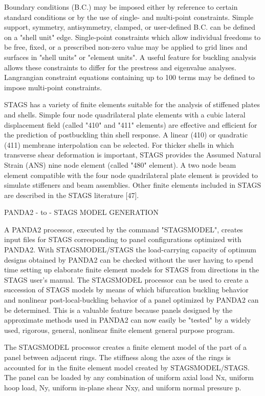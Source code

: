 Boundary conditions (B.C.) may be imposed either by reference to certain
standard conditions or by the use of single- and multi-point constraints.
Simple support, symmetry, antisymmetry, clamped, or user-defined B.C. can
be defined on a "shell unit" edge.  Single-point constraints which allow
individual freedoms to be free, fixed, or a prescribed non-zero value may
be applied to grid lines and surfaces in "shell units" or "element units".
 A useful feature for buckling analysis allows these constraints to differ
for the prestress and eigenvalue analyses. Langrangian constraint
equations containing up to 100 terms may be defined to impose multi-point
constraints. 

STAGS has a variety of finite elements suitable for the analysis of
stiffened plates and shells.  Simple four node quadrilateral plate
elements with a cubic lateral displacement field (called "410" and "411"
elements) are effective and efficient for the prediction of postbuckling
thin shell response.  A linear (410) or quadratic (411) membrane
interpolation can be selected.  For thicker shells in which transverse
shear deformation is important, STAGS provides the Assumed Natural Strain
(ANS) nine node element (called "480" element).  A two node beam element
compatible with the four node quadrilateral plate element is provided to
simulate stiffeners and beam assemblies.  Other finite elements included
in STAGS are described in the STAGS literature [47]. 


              PANDA2 - to - STAGS  MODEL GENERATION

A PANDA2 processor, executed by the command "STAGSMODEL", creates
input files for STAGS corresponding to panel configurations optimized with
PANDA2.  With STAGSMODEL/STAGS the load-carrying capacity of optimum
designs obtained by PANDA2 can be checked without the user having to spend
time setting up elaborate finite element models for STAGS from directions
in the STAGS user's manual. The STAGSMODEL processor can be used to create
a succession of STAGS models by means of which bifurcation buckling
behavior and nonlinear post-local-buckling behavior of a panel optimized
by PANDA2 can be determined. This is a valuable feature because panels
designed by the approximate methods used in PANDA2 can now easily be
"tested" by a widely used, rigorous, general, nonlinear finite element
general purpose program. 

The STAGSMODEL processor creates a finite element model of the part of a
panel between adjacent rings. The stiffness along the axes of the rings is
accounted for in the finite element model created by STAGSMODEL/STAGS. The
panel can be loaded by any combination of uniform axial load Nx, uniform
hoop load, Ny, uniform in-plane shear Nxy, and uniform normal pressure p. 

